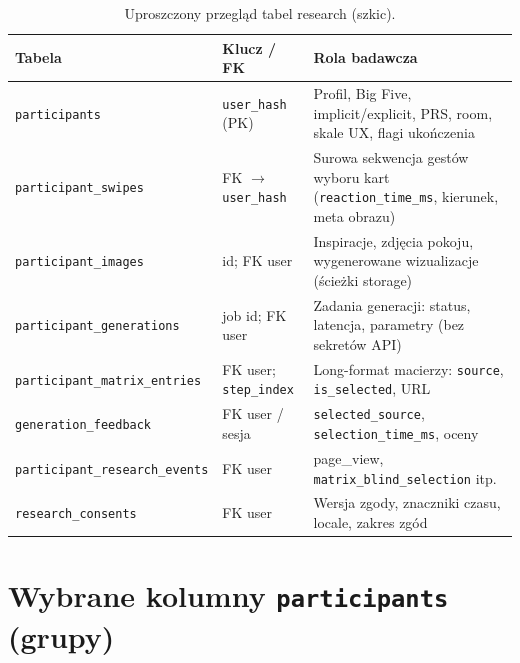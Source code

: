 \begin{table}[htbp]
  \centering
  \small
  \caption{Uproszczony przegląd tabel research (szkic).}
  \label{tab:app:a:tables}
  \begin{tabular}{@{}llp{6.5cm}@{}}
    \toprule
    Tabela & Klucz / FK & Rola badawcza \\
    \midrule
    \texttt{participants} &
      \texttt{user\_hash} (PK) &
      Profil, Big Five, implicit/explicit, PRS, room, skale UX, flagi ukończenia \\
    \texttt{participant\_swipes} &
      FK $\rightarrow$ \texttt{user\_hash} &
      Surowa sekwencja gestów wyboru kart (\texttt{reaction\_time\_ms}, kierunek, meta obrazu) \\
    \texttt{participant\_images} &
      id; FK user &
      Inspiracje, zdjęcia pokoju, wygenerowane wizualizacje (ścieżki storage) \\
    \texttt{participant\_generations} &
      job id; FK user &
      Zadania generacji: status, latencja, parametry (bez sekretów API) \\
    \texttt{participant\_matrix\_entries} &
      FK user; \texttt{step\_index} &
      Long-format macierzy: \texttt{source}, \texttt{is\_selected}, URL \\
    \texttt{generation\_feedback} &
      FK user / sesja &
      \texttt{selected\_source}, \texttt{selection\_time\_ms}, oceny \\
    \texttt{participant\_research\_events} &
      FK user &
      page\_view, \texttt{matrix\_blind\_selection} itp. \\
    \texttt{research\_consents} &
      FK user &
      Wersja zgody, znaczniki czasu, locale, zakres zgód \\
    \bottomrule
  \end{tabular}
\end{table}

\section{Wybrane kolumny \texttt{participants} (grupy)}
\label{app:a:sec:participants}

